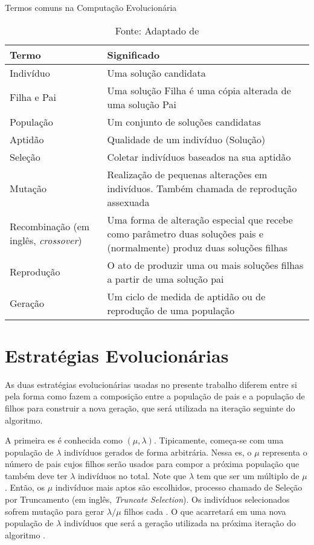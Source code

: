 \begin{table}[tp]
	\centering
	\caption{Termos comuns na Computação Evolucionária}
	\label{tbl:evo_dict}
	\begin{tabularx}{\linewidth}{|X|X|}
		\hline
		\textbf{Termo} & \textbf{Significado} \\
		\hline
		Indivíduo & Uma solução candidata \\
		\hline
		Filha e Pai & Uma solução Filha é uma cópia alterada de uma solução Pai \\
		\hline
		População & Um conjunto de soluções candidatas \\
		\hline
		Aptidão & Qualidade de um indivíduo (Solução) \\
		\hline
		Seleção & Coletar indivíduos baseados na sua aptidão \\
		\hline
		Mutação & Realização de pequenas alterações em indivíduos. Também chamada de reprodução assexuada \\
		\hline
		Recombinação (em inglês, \textit{crossover}) & Uma forma de alteração especial que recebe como parâmetro duas soluções pais e (normalmente) produz duas soluções filhas \\
		\hline
		Reprodução & O ato de produzir uma ou mais soluções filhas a partir de uma solução pai \\
		\hline
		Geração & Um ciclo de medida de aptidão ou de reprodução de uma população \\
		\hline
	\end{tabularx}
	\caption*{Fonte: Adaptado de \citep{Luke2013Metaheuristics}}
\end{table}

\section{Estratégias Evolucionárias}

As duas estratégias evolucionárias usadas no presente trabalho diferem entre si 
pela forma como fazem a composição entre a população de pais e a população de 
filhos para construir a nova geração, que será utilizada na iteração seguinte do 
algoritmo.

A primeira \ac{es} é conhecida como $( \mu, \lambda )$. Tipicamente, começa-se 
com uma população de $\lambda$ indivíduos gerados de forma arbitrária. Nessa 
\ac{es}, o $\mu$ representa o número de pais cujos filhos serão usados para 
compor a próxima população que também deve ter $\lambda$ indivíduos no total. 
Note que $\lambda$ tem que ser um múltiplo de $\mu$. Então, os $\mu$ indivíduos 
mais aptos são escolhidos, processo chamado de Seleção por Truncamento (em 
inglês, \textit{Truncate Selection}). Os indivíduos selecionados sofrem mutação 
para gerar $ \lambda / \mu $ filhos cada . O que acarretará em uma nova 
população de $\lambda$ indivíduos que será a geração utilizada na próxima 
iteração do algoritmo \citep{Luke2013Metaheuristics}.

